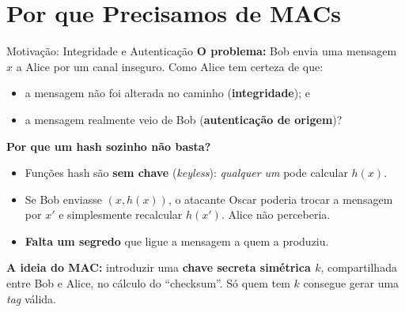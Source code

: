 \documentclass{beamer}
\begin{document}
\section{Por que Precisamos de MACs}

\begin{frame}{Motivação: Integridade e Autenticação}
    \textbf{O problema:} Bob envia uma mensagem $x$ a Alice por um canal inseguro. Como Alice tem certeza de que:
    \begin{itemize}
        \item a mensagem \alert{não foi alterada} no caminho (\textbf{integridade}); e
        \item a mensagem realmente \alert{veio de Bob} (\textbf{autenticação de origem})?
    \end{itemize}
    \bigskip\pause
    \textbf{Por que um hash sozinho não basta?}
    \begin{itemize}
        \footnotesize
        \item Funções hash são \textbf{sem chave} (\textit{keyless}): \emph{qualquer um} pode calcular $h(x)$.
        \item Se Bob enviasse $(x, h(x))$, o atacante Oscar poderia trocar a mensagem por $x'$ e simplesmente recalcular $h(x')$. Alice não perceberia.
        \item \textbf{Falta um segredo} que ligue a mensagem a quem a produziu.
    \end{itemize}
    \bigskip\pause
    \textbf{A ideia do MAC:} introduzir uma \textbf{chave secreta simétrica $k$}, compartilhada entre Bob e Alice, no cálculo do ``checksum''. Só quem tem $k$ consegue gerar uma \textit{tag} válida.
\end{frame}
\end{document}
